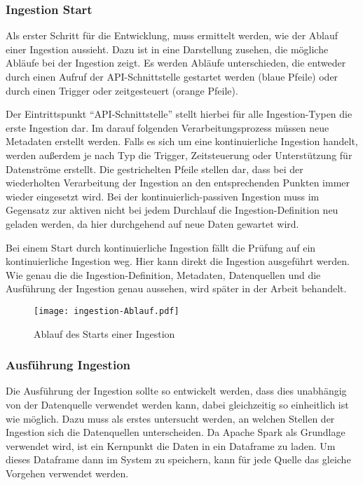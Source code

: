 \subsubsection{Ingestion Start}
Als erster Schritt für die Entwicklung, muss ermittelt werden, wie der Ablauf einer Ingestion aussieht.
Dazu ist in  eine Darstellung zusehen, die mögliche Abläufe bei der Ingestion zeigt.
Es werden Abläufe unterschieden, die entweder durch einen Aufruf der API-Schnittstelle gestartet werden (blaue Pfeile) oder durch einen Trigger oder zeitgesteuert (orange Pfeile).

Der Eintrittspunkt ``API-Schnittstelle'' stellt hierbei für alle Ingestion-Typen die erste Ingestion dar.
Im darauf folgenden Verarbeitungsprozess müssen neue Metadaten erstellt werden.
Falls es sich um eine kontinuierliche Ingestion handelt, werden außerdem je nach Typ die Trigger, Zeitsteuerung oder Unterstützung für Datenströme erstellt.
Die gestrichelten Pfeile stellen dar, dass bei der wiederholten Verarbeitung der Ingestion an den entsprechenden Punkten immer wieder eingesetzt wird.
Bei der kontinuierlich-passiven Ingestion muss im Gegensatz zur aktiven nicht bei jedem Durchlauf die Ingestion-Definition neu geladen werden, da hier durchgehend auf neue Daten gewartet wird.

Bei einem Start durch kontinuierliche Ingestion fällt die Prüfung auf ein kontinuierliche Ingestion weg.
Hier kann direkt die Ingestion ausgeführt werden.
Wie genau die die Ingestion-Definition, Metadaten, Datenquellen und die Ausführung der Ingestion genau aussehen, wird später in der Arbeit behandelt.


\begin{figure}
    \centering
    \texttt{[image: ingestion-Ablauf.pdf]}
    \caption{Ablauf des Starts einer Ingestion}
    \label{fig:ingestion_ablauf}
\end{figure}

\subsubsection{Ausführung Ingestion}
Die Ausführung der Ingestion sollte so entwickelt werden, dass dies unabhängig von der Datenquelle verwendet werden kann, dabei gleichzeitig so einheitlich ist wie möglich.
Dazu muss als erstes untersucht werden, an welchen Stellen der Ingestion sich die Datenquellen unterscheiden.
Da Apache Spark als Grundlage verwendet wird, ist ein Kernpunkt die Daten in ein Dataframe zu laden.
Um dieses Dataframe dann im System zu speichern, kann für jede Quelle das gleiche Vorgehen verwendet werden.

